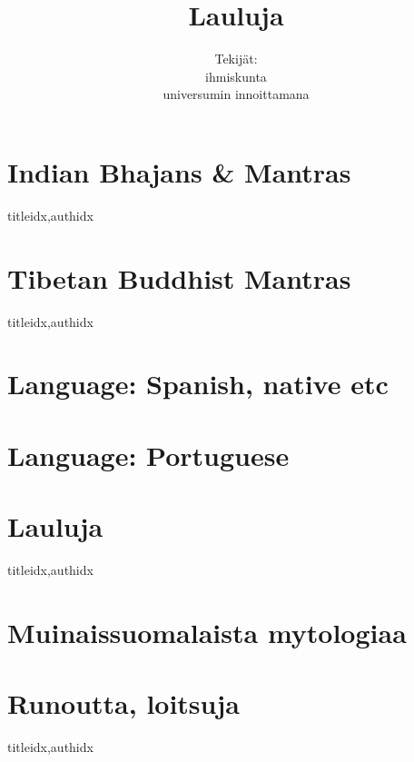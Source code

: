 \documentclass[twoside,10pt,finnish]{book}
\title{Lauluja}
\author{Tekijät: \\
        ihmiskunta \\
        universumin innoittamana}
\renewcommand{\lyricfont}{\sffamily\Large} %
\begin{document}
  \maketitle
  \tableofcontents %

  \clearpage\scleardpage
    \section{Indian Bhajans \& Mantras} 
      \begin{songs}{titleidx,authidx}
        \setcounter{songnum}{100}
        
      \end{songs}
     \scleardpage
    \section{Tibetan Buddhist Mantras}
      \begin{songs}{titleidx,authidx}
        \setcounter{songnum}{170}
        
      \end{songs}  
  
  \clearpage\scleardpage
    \section{Language: Spanish, native etc}
    \section{Language: Portuguese}
  
  \clearpage\scleardpage
  
  \clearpage\scleardpage
    \section{Lauluja}
      \begin{songs}{titleidx,authidx}
        
      \end{songs}

    \section{Muinaissuomalaista mytologiaa}
      
    \section{Runoutta, loitsuja}
      \begin{songs}{titleidx,authidx}
        \setcounter{songnum}{470}
        \chordsoff %
        \renewcommand{\lyricfont}{\sffamily\small} %
        
        \renewcommand{\lyricfont}{\sffamily\Large} %
        \chordson
      \end{songs}

  
  \clearpage
\end{document}
